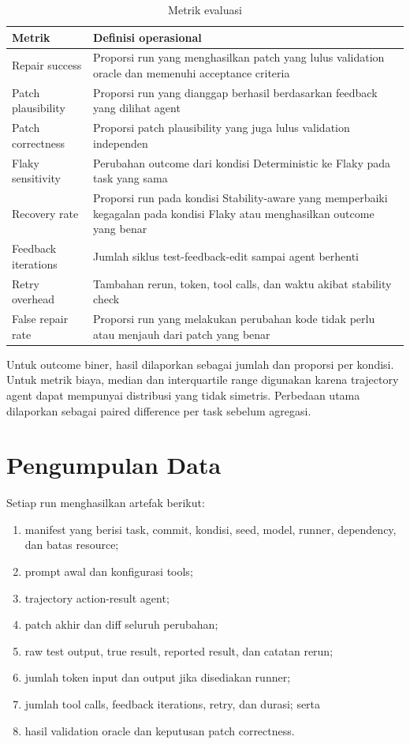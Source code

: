 \begin{table}[htbp]
\centering
\small
\renewcommand{\arraystretch}{1.25}
\caption{Metrik evaluasi}
\label{tab:metrics}
\begin{tabularx}{\textwidth}{p{3.8cm}Y}
\toprule
\textbf{Metrik} & \textbf{Definisi operasional} \\
\midrule
Repair success & Proporsi run yang menghasilkan patch yang lulus validation oracle dan memenuhi acceptance criteria \\
Patch plausibility & Proporsi run yang dianggap berhasil berdasarkan feedback yang dilihat agent \\
Patch correctness & Proporsi patch plausibility yang juga lulus validation independen \\
Flaky sensitivity & Perubahan outcome dari kondisi Deterministic ke Flaky pada task yang sama \\
Recovery rate & Proporsi run pada kondisi Stability-aware yang memperbaiki kegagalan pada kondisi Flaky atau menghasilkan outcome yang benar \\
Feedback iterations & Jumlah siklus test-feedback-edit sampai agent berhenti \\
Retry overhead & Tambahan rerun, token, tool calls, dan waktu akibat stability check \\
False repair rate & Proporsi run yang melakukan perubahan kode tidak perlu atau menjauh dari patch yang benar \\
\bottomrule
\end{tabularx}
\end{table}

Untuk outcome biner, hasil dilaporkan sebagai jumlah dan proporsi per kondisi. Untuk metrik biaya, median dan interquartile range digunakan karena trajectory agent dapat mempunyai distribusi yang tidak simetris. Perbedaan utama dilaporkan sebagai paired difference per task sebelum agregasi.

\section{Pengumpulan Data}

Setiap run menghasilkan artefak berikut:

\begin{enumerate}[leftmargin=*]
    \item manifest yang berisi task, commit, kondisi, seed, model, runner, dependency, dan batas resource;
    \item prompt awal dan konfigurasi tools;
    \item trajectory action-result agent;
    \item patch akhir dan diff seluruh perubahan;
    \item raw test output, true result, reported result, dan catatan rerun;
    \item jumlah token input dan output jika disediakan runner;
    \item jumlah tool calls, feedback iterations, retry, dan durasi; serta
    \item hasil validation oracle dan keputusan patch correctness.
\end{enumerate}

